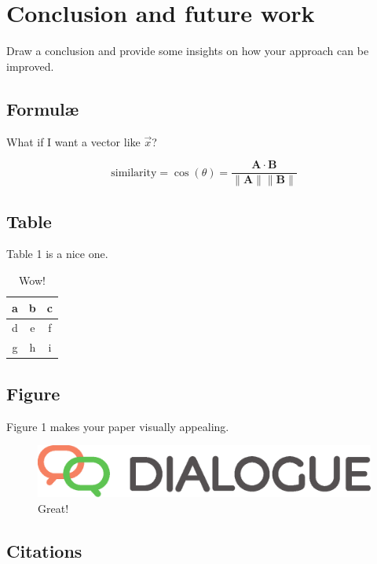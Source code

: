 \documentclass{dialogue}
\begin{document}
\section{Conclusion and future work}
Draw a conclusion and provide some insights on how your approach can be improved.


\subsection{Formul\ae}

What if I want a vector like $\vec{x}$?

\begin{equation}
  \text{similarity} = \cos(\theta) = \frac{\mathbf{A} \cdot \mathbf{B}}{\|\mathbf{A}\| \|\mathbf{B}\|}
\end{equation}

\subsection{Table}

Table 1 is a nice one.

\begin{table}[htbp]
\centering
\caption{Wow!}
\begin{tabular}{|c|c|c|}\hline
a & b & c \\\hline
d & e & f \\\hline
g & h & i \\\hline
\end{tabular}
\end{table}

\subsection{Figure}

Figure 1 makes your paper visually appealing.

\begin{figure}[htbp]
\centering
\includegraphics[scale=.4]{dialogue.eps}
\caption{Great!}
\end{figure}

\subsection{Citations}
\end{document}
